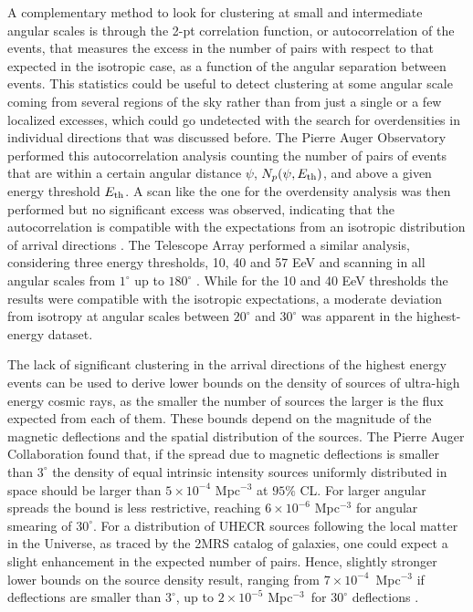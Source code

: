 \documentclass[twoside,12pt]{article}
\begin{document}
A complementary method to look for clustering at small and intermediate angular scales is through the 2-pt correlation function, or autocorrelation of the events,  that measures the excess in the number of pairs with respect to that expected in the isotropic case, as a function of the angular separation between events. This statistics could be useful to detect clustering at some angular scale coming from  several regions of the sky rather than from just a single or a few localized excesses, which could go undetected with the search for overdensities in individual directions that was discussed before. The Pierre Auger Observatory performed this autocorrelation analysis counting the number of pairs of events that are within a certain angular distance $\psi$, $N_p (\psi, E_{\rm th})$, and above a given energy threshold $E_{\rm th}$. A scan like the one for the overdensity analysis was then performed but no significant excess was observed, indicating that the autocorrelation is compatible with the expectations from an isotropic distribution of arrival directions \cite{SS15}. The Telescope Array performed a similar analysis, considering three energy thresholds, 10, 40 and 57 EeV and scanning in all angular scales from $1^\circ$ up to $180^\circ$ \cite{taicrc15b}. While for the 10 and 40 EeV thresholds the results were compatible with the isotropic expectations, a moderate deviation from isotropy at angular scales between $20^\circ$ and $30^\circ$ was apparent in the highest-energy dataset.

The lack of significant clustering in the arrival directions of the highest energy events can be used to derive lower bounds on the density of sources of ultra-high energy cosmic rays, as the smaller the number of sources the larger is the flux expected from each of them. These bounds depend on the magnitude of the magnetic deflections and the spatial distribution of the sources. The Pierre Auger Collaboration found that, if the spread
due to magnetic deflections is smaller than $3^\circ$ the density of equal intrinsic intensity sources uniformly distributed in space should be larger than $5 \times 10^{-4}$ Mpc$^{-3}$ at $95\%$ CL. For larger angular spreads the bound is less restrictive, reaching $6 \times 10^{-6}$ Mpc$^{-3}$ for angular smearing of $30^\circ$. For a distribution of UHECR sources following the local matter in the Universe, as traced by the 2MRS catalog of galaxies, one could expect a slight enhancement in the expected number of pairs. Hence, slightly stronger lower bounds on the source density result,  ranging from $7 \times 10^{-4}$~Mpc$^{-3}$ if deflections are smaller than  $3^\circ$, up to $2 \times 10^{-5}$ Mpc$^{-3}$~for $30^\circ$
deflections \cite{augersd}. 
\end{document}
